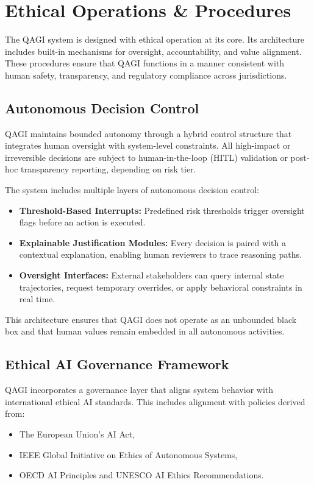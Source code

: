 \documentclass{article}
\theoremstyle{plain}
\theoremstyle{claimstyle}
\begin{document}
\section{Ethical Operations \& Procedures}
\label{EthicalOperations}

The QAGI system is designed with ethical operation at its core. Its architecture includes built-in mechanisms for oversight, accountability, and value alignment. These procedures ensure that QAGI functions in a manner consistent with human safety, transparency, and regulatory compliance across jurisdictions.

\subsection{Autonomous Decision Control}

QAGI maintains bounded autonomy through a hybrid control structure that integrates human oversight with system-level constraints. All high-impact or irreversible decisions are subject to human-in-the-loop (HITL) validation or post-hoc transparency reporting, depending on risk tier.

The system includes multiple layers of autonomous decision control:
\begin{itemize}
    \item \textbf{Threshold-Based Interrupts:} Predefined risk thresholds trigger oversight flags before an action is executed.
    \item \textbf{Explainable Justification Modules:} Every decision is paired with a contextual explanation, enabling human reviewers to trace reasoning paths.
    \item \textbf{Oversight Interfaces:} External stakeholders can query internal state trajectories, request temporary overrides, or apply behavioral constraints in real time.
\end{itemize}

This architecture ensures that QAGI does not operate as an unbounded black box and that human values remain embedded in all autonomous activities.

\subsection{Ethical AI Governance Framework}

QAGI incorporates a governance layer that aligns system behavior with international ethical AI standards. This includes alignment with policies derived from:
\begin{itemize}
    \item The European Union’s AI Act,
    \item IEEE Global Initiative on Ethics of Autonomous Systems,
    \item OECD AI Principles and UNESCO AI Ethics Recommendations.
\end{itemize}
\end{document}
